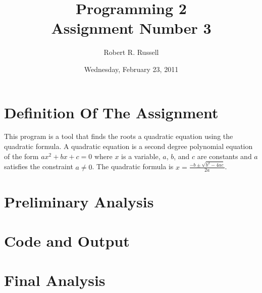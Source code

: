 \documentclass[letterpaper,oneside]{scrartcl}
\title{Programming 2\\Assignment Number 3}
\author{Robert R. Russell}
\date{Wednesday, February 23, 2011}
\begin{document}
\maketitle

\section{Definition Of The Assignment}
This program is a tool that finds the roots a quadratic equation using the quadratic formula.
A quadratic equation is a second degree polynomial equation of the form $ax^2 + bx + c = 0$ where $x$
is a variable, $a$, $b$, and $c$ are constants and $a$ satisfies the constraint $a \neq 0$. The quadratic formula
is $x = \frac{-b \pm \sqrt{b^2-4ac}}{2a}$.

\section{Preliminary Analysis}


\section{Code and Output}

\section{Final Analysis}
\end{document}
